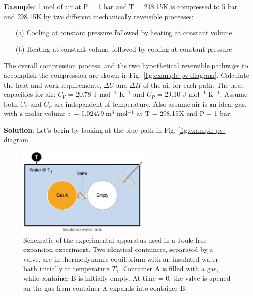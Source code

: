 \documentclass[11pt]{article}
\theoremstyle{definition}
\begin{document}
\begin{mdframed}[backgroundcolor=lgray]
	\noindent\textbf{Example}: 1 mol of air at P = 1 bar and T = 298.15K is compressed to 5 bar and 298.15K by two different mechanically reversible processes:
	\begin{enumerate}
		\item[(a)]{Cooling at constant pressure followed by heating at constant volume}
		\item[(b)]{Heating at constant volume followed by cooling at constant pressure}
	\end{enumerate}
	The overall compression process, and the two hypothetical reversible pathways to accomplish the compression are shown in Fig. \ref{fig:example-pv-diagram}.
	Calculate the heat and work requirements, $\Delta{U}$ and $\Delta{H}$ of the air for each path.
	The heat capacities for air: $C_{V}$ = 20.78 J mol$^{\mathrm{-1}}$ K$^{\mathrm{-1}}$ and $C_{P}$ = 29.10 J mol$^{\mathrm{-1}}$ K$^{\mathrm{-1}}$.
	Assume both $C_{V}$ and $C_{P}$ are independent of temperature.
	Also assume air is an ideal gas, with a molar volume $v$ = 0.02479 m$^{\mathrm{3}}$ mol$^{\mathrm{-1}}$ at T = 298.15K and P = 1 bar.

	\vspace{0.1in}
	\noindent\textbf{Solution}: Let's begin by looking at the blue path in Fig. \ref{fig:example-pv-diagram}.
\end{mdframed}
\clearpage


\begin{figure}\center
\includegraphics[width=0.58\textwidth]{./figs/JouleExpansion.pdf}
\caption{Schematic of the experimental apparatus used in a Joule free expansion experiment.
Two identical containers, separated by a valve, are in thermodynamic equilibrium with an insulated water bath initially at temperature $T_{1}$.
Container A is filled with a gas, while container B is initially empty.
At time = 0, the valve is opened an the gas from container A expands into container B.}\label{fig-joule-expansion}
\end{figure}
\end{document}
